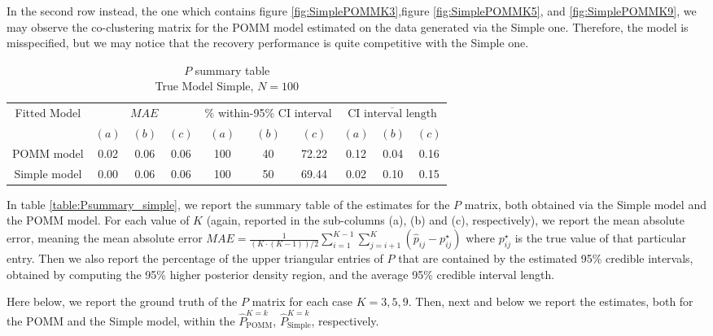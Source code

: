 \documentclass[11pt]{amsart}
\begin{document}
In the second row instead, the one which contains figure \ref{fig:SimplePOMMK3},figure \ref{fig:SimplePOMMK5}, and \ref{fig:SimplePOMMK9}, we may observe the co-clustering matrix for the POMM model estimated on the data generated via the Simple one. Therefore, the model is misspecified, but we may notice that the recovery performance is quite competitive with the Simple one.



\begin{table}[htbp]
\centering
\caption{
{\large $P$ summary table} \\ 
{\small True Model Simple, $N=100$}
} 
\begin{tabular}{cccccccccc}
\toprule
\multirow{2}{*}{Fitted Model} & \multicolumn{3}{c}{
$MAE$ } & \multicolumn{3}{c}{
$\%$ within-95\% CI interval} & \multicolumn{3}{c}{ $\overline{\text{CI interval length}}$} \\
\cmidrule(lr){2-4} \cmidrule(lr){5-7} \cmidrule(lr){8-10}
& $(a)$ & $(b)$ & $(c)$ & $(a)$ & $(b)$ & $(c)$ & $(a)$ & $(b)$ & $(c)$ \\
\midrule
POMM model  &0.02 & 0.06 & 0.06 & 100 & 40 & 72.22 & 0.12 & 0.04 & 0.16 \\
Simple model & 0.00 & 0.06 & 0.06 & 100 & 50 & 69.44 & 0.02 & 0.10 & 0.15 \\
\bottomrule
\end{tabular}
\label{table:Psummary_simple}
\end{table}

In table \eqref{table:Psummary_simple}, we report the summary table of the estimates for the $P$ matrix, both obtained via the Simple model and the POMM model. For each value of $K$ (again, reported in the sub-columns (a), (b) and (c), respectively), we report the mean absolute error, meaning the mean absolute error $MAE = \frac{1}{(K\cdot(K-1))/2} \sum_{i=1}^{K-1}\sum_{j=i+1}^K \left(\hat{p}_{ij} - p^\star_{ij}\right)$ where $p^\star_{ij}$ is the true value of that particular entry. Then we also report the percentage of the upper triangular entries of $P$ that are contained by the estimated 95\% credible intervals, obtained by computing the 95\% higher posterior density region, and the average 95\% credible interval length. 

Here below, we report the ground truth of the $P$ matrix for each case $K=3,5,9$. Then, next and below we report the estimates, both for the POMM and the Simple model, within the $\hat{P}^{K=k}_{\text{POMM}}$, $\hat{P}^{K=k}_{\text{Simple}}$, respectively.
\end{document}
